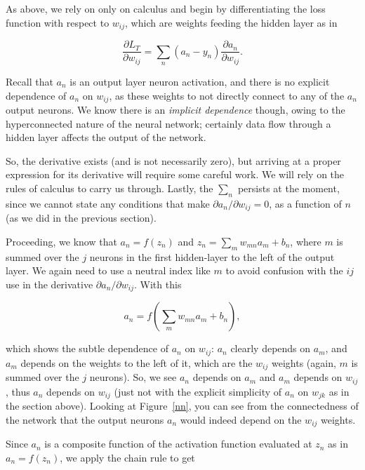 \documentclass[12pt]{article}
\begin{document}
As above, we rely on only on calculus and begin by differentiating the loss function with respect to $w_{ij}$, which are weights feeding the hidden layer as in

\begin{equation}
\frac{\partial L_T}{\partial w_{ij}} = \sum_n (a_n-y_n)\frac{\partial a_n}{\partial w_{ij}}.
\label{ij_deriv}
\end{equation}

Recall that $a_n$ is an output layer neuron activation, and there is no explicit dependence of $a_n$ on $w_{ij}$, as these weights to not directly connect to any of the $a_n$ output neurons. We know there is an {\sl implicit dependence} though, owing to the hyperconnected nature of the neural network; certainly data flow through a hidden layer affects the output of the network.  

So, the derivative exists (and is not necessarily zero), but arriving at a proper  expression for its derivative will require some careful work. We will rely on the rules of calculus to carry us through.  Lastly, the $\sum_n$ persists at the moment, since we cannot state any conditions that make $\partial a_n/\partial w_{ij}=0$, as a function of $n$ (as we did in the previous section).

Proceeding, we know that $a_n=f(z_n)$ and $z_n=\sum_m w_{mn} a_m + b_n$, where $m$ is summed over the $j$ neurons in the first hidden-layer to the left of the output layer. We again need to use a neutral index like $m$ to avoid confusion with the $ij$ use in the derivative $\partial a_n/\partial w_{ij}$.  With this

\begin{equation}
a_n=f\left(\sum_m w_{mn} a_m + b_n\right),
\end{equation}

\noindent which shows the subtle dependence of $a_n$ on $w_{ij}$: $a_n$ clearly depends on $a_m$, and $a_m$ depends on the weights to the left of it, which are the $w_{ij}$ weights (again, $m$ is summed over the $j$ neurons). So, we see $a_n$ depends on $a_m$ and $a_m$ depends on $w_{ij}$, thus $a_n$ depends on $w_{ij}$ (just not with the explicit simplicity of $a_n$ on $w_{jk}$ as in the section above). Looking at Figure~\ref{nn}, you can see from the connectedness of the network that the output neurons $a_n$ would indeed depend on the $w_{ij}$ weights.

Since $a_n$ is a composite function of the activation function evaluated at $z_n$ as in $a_n=f(z_n)$, we apply the chain rule to get
\end{document}
